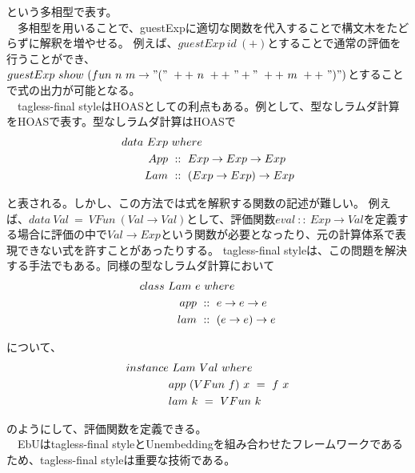 \documentclass[uplatex]{sumiilab-paper}
\theoremstyle{mystyle}
\numberwithin{definition}{chapter} %
\begin{document}
という多相型で表す。\\
　多相型を用いることで、guestExpに適切な関数を代入することで構文木をたどらずに解釈を増やせる。
例えば、$guestExp~id~(+)$とすることで通常の評価を行うことができ、$guestExp~show~(fun~n~m\rightarrow"("~++~n~++~"+"~++~m~++~")")$とすることで式の出力が可能となる。\\
　tagless-final styleはHOASとしての利点もある。例として、型なしラムダ計算をHOASで表す。型なしラムダ計算はHOASで
\begin{align}
  data~Exp~&where \notag \\
  App~&::~Exp \rightarrow Exp \rightarrow Exp \notag \\
  Lam~&::~(Exp \rightarrow Exp) \rightarrow Exp \notag
\end{align}

と表される。しかし、この方法では式を解釈する関数の記述が難しい。
例えば、$data~Val~=~VFun~(Val \rightarrow Val)$として、評価関数$eval~::~Exp \rightarrow Val$を定義する場合に評価の中で$Val \rightarrow Exp$という関数が必要となったり、元の計算体系で表現できない式を許すことがあったりする。
tagless-final styleは、この問題を解決する手法でもある。同様の型なしラムダ計算において
\begin{align}
  class~Lam~e&~where \notag \\
  app~&::~e \rightarrow e \rightarrow e \notag \\
  lam~&::~(e \rightarrow e) \rightarrow e \notag
\end{align}

について、　
\begin{align}
  instance&~Lam~Val~where \notag \\
  &app~(VFun~f)~x~=~f~x \notag \\
  &lam~k~=~VFun~k \notag
\end{align}

のようにして、評価関数を定義できる。\\
　EbUはtagless-final styleとUnembeddingを組み合わせたフレームワークであるため、tagless-final styleは重要な技術である。
\end{document}
